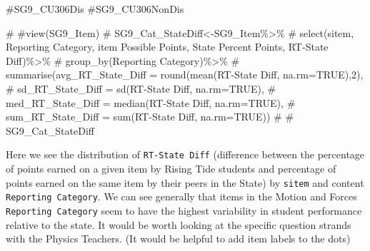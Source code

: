 \documentclass[
  letterpaper,
  DIV=11,
  numbers=noendperiod]{scrartcl}
\newenvironment{Shaded}{\begin{snugshade}}{\end{snugshade}}
\newcommand{\CommentTok}[1]{\textcolor[rgb]{0.37,0.37,0.37}{#1}}
\begin{document}
\begin{Shaded}
\begin{Highlighting}[]
\CommentTok{\#SG9\_CU306Dis}
\CommentTok{\#SG9\_CU306NonDis}
\end{Highlighting}
\end{Shaded}

\begin{Shaded}
\begin{Highlighting}[]
\CommentTok{\# \#view(SG9\_Item)}
\CommentTok{\# SG9\_Cat\_StateDiff\textless{}{-}SG9\_Item\%\textgreater{}\%}
\CommentTok{\#   select(\textasciigrave{}sitem\textasciigrave{}, \textasciigrave{}Reporting Category\textasciigrave{}, \textasciigrave{}item Possible Points\textasciigrave{}, \textasciigrave{}State Percent Points\textasciigrave{}, \textasciigrave{}RT{-}State Diff\textasciigrave{})\%\textgreater{}\%}
\CommentTok{\#   group\_by(\textasciigrave{}Reporting Category\textasciigrave{})\%\textgreater{}\%}
\CommentTok{\#   summarise(avg\_RT\_State\_Diff = round(mean(\textasciigrave{}RT{-}State Diff\textasciigrave{}, na.rm=TRUE),2),}
\CommentTok{\#             sd\_RT\_State\_Diff = sd(\textasciigrave{}RT{-}State Diff\textasciigrave{}, na.rm=TRUE),}
\CommentTok{\#             med\_RT\_State\_Diff = median(\textasciigrave{}RT{-}State Diff\textasciigrave{}, na.rm=TRUE),}
\CommentTok{\#             sum\_RT\_State\_Diff = sum(\textasciigrave{}RT{-}State Diff\textasciigrave{}, na.rm=TRUE))}
\CommentTok{\# }
\CommentTok{\# SG9\_Cat\_StateDiff}
\end{Highlighting}
\end{Shaded}

Here we see the distribution of \texttt{RT-State\ Diff} (difference
between the percentage of points earned on a given item by Rising Tide
students and percentage of points earned on the same item by their peers
in the State) by \texttt{sitem} and content
\texttt{Reporting\ Category}. We can see generally that items in the
Motion and Forces \texttt{Reporting\ Category} seem to have the highest
variability in student performance relative to the state. It would be
worth looking at the specific question strands with the Physics
Teachers. (It would be helpful to add item labels to the dots)
\end{document}
